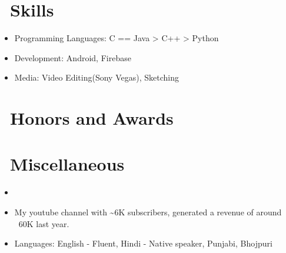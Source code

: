 \documentclass{resume}
\begin{document}
\section{\faCogs\ Skills}
\begin{itemize}[parsep=0.5ex]
  \item Programming Languages: C == Java > C++ > Python
  \item Development: Android, Firebase
  \item Media: Video Editing(Sony Vegas), Sketching 
\end{itemize}

\section{\faTrophy\ Honors and Awards}

\section{\faInfo\ Miscellaneous}
\begin{itemize}[parsep=0.5ex]
  \item {}
  \item {} My youtube channel with \sim6K subscribers, generated a revenue of around \rupee~60K last year.
  \item Languages: English - Fluent, Hindi - Native speaker, Punjabi, Bhojpuri
\end{itemize}

%
%
\end{document}
